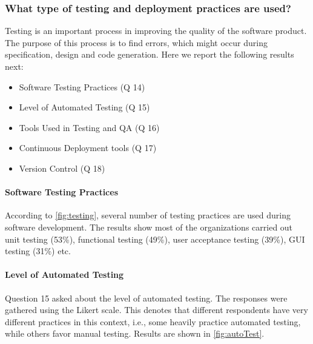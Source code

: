 \subsubsection{What type of testing and deployment practices are used?}
\label{testing_practices}

Testing is an important process in improving the quality of the software product. The purpose of this process is to find errors, which might occur during specification, design and code generation. Here we report the following results next:
\begin{itemize}
\item Software Testing Practices (Q 14)
\item Level of Automated Testing (Q 15)
\item Tools Used in Testing and QA (Q 16)
\item Continuous Deployment tools (Q 17)
\item Version Control (Q 18)
\end{itemize}


\paragraph{Software Testing Practices}
According to \ref{fig:testing}, several number of testing practices are used during software development. The results show most of the organizations carried out unit testing (53\%), functional testing (49\%), user acceptance testing (39\%), GUI testing (31\%) etc.



\paragraph{Level of Automated Testing}
Question 15 asked about the level of automated testing. The responses were gathered using the Likert scale. This denotes that different respondents have very different practices in this context, i.e., some heavily practice automated testing, while others favor manual testing. Results are shown in \ref{fig:autoTest}.



